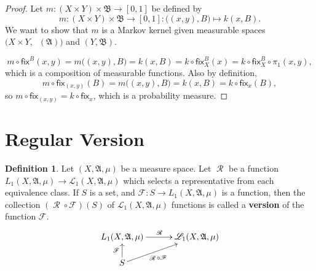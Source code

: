 \documentclass[
twoside=true,
paper=letter,
fontsize=9pt,
pagesize=auto,
leqno,
openany,
headsepline,
overfullrule,
]{scrbook}
\theoremstyle{plain}
\theoremstyle{plain}
\theoremstyle{definition}
\theoremstyle{bfnoteitalic}
\theoremstyle{bfnoteroman}
\newtheorem{defnboldnote}[thm]{Definition}
\newcommand{\term}[1]{\textbf{#1}\index{#1}}
\newcommand{\sigalg}[1]{\mathfrak{#1}}
\newcommand{\cali}[1]{\mathscr{#1}}
\newcommand{\sfop}[1]{\mathsf{#1}}
\newcommand{\preimage}[1]{\mathop{#1^{\leftarrow}}}
\newcommand{\sigmaalgebra}{\sigalg{A}}
\newcommand{\sigmaalgebraii}{\sigalg{B}}
\newcommand{\Lone}{L_1(\measurespace, \sigmaalgebra, \measure)}
\newcommand{\caliLone}{\cali{L}_1(\measurespace, \sigmaalgebra, \measure)}
\newcommand{\measurespace}{X}
\newcommand{\measurespaceii}{Y}
\newcommand{\mspaceelt}{x}
\newcommand{\mspaceeltii}{y}
\newcommand{\measure}{\mu}
\newcommand{\setii}{B}
\newcommand{\regular}{\mathop{\cali{R}}}
\newcommand{\projectionone}{\pi_1}
\newcommand{\markovkernel}{k}
\newcommand{\markovkernelii}{m}
\newcommand{\fixinthefirst}[1]{\sfop{fix}_{#1}}
\newcommand{\fixinthesecond}[1]{\sfop{fix}^{#1}}
\begin{document}
\begin{proof}
Let
$\markovkernelii:
(\measurespace\times\measurespaceii) \times \sigmaalgebraii 
\to
[0,1]$
be defined by
\[
\markovkernelii:
(\measurespace\times\measurespaceii) \times \sigmaalgebraii 
\to
[0,1]
: 
\bigl((\mspaceelt,\mspaceeltii),\setii\bigr)\mapsto 
\markovkernel(\mspaceelt,\setii).
\]
We want to show that 
$\markovkernelii$ is a Markov kernel given measurable spaces
$\bigl(\measurespace\times\measurespaceii, \preimage\projectionone(\sigmaalgebra)\bigr)$
and
$(\measurespaceii, \sigmaalgebraii)$.

\[
\markovkernelii\circ
\fixinthesecond{\setii}(\mspaceelt,\mspaceeltii)
=
\markovkernelii\bigl((\mspaceelt,\mspaceeltii),\setii\bigr)
=
\markovkernel(\mspaceelt,\setii)
=
\markovkernel\circ\fixinthesecond{\setii}_\measurespace(\mspaceelt)
=
\markovkernel\circ\fixinthesecond{\setii}_\measurespace\circ\projectionone(\mspaceelt,\mspaceeltii),
\]
which is a composition of measurable functions.
Also by definition,
\[
\markovkernelii\circ\fixinthefirst{(\mspaceelt,\mspaceeltii)}(\setii)
=
\markovkernelii\bigl((\mspaceelt,\mspaceeltii),\setii\bigr)
=
\markovkernel(\mspaceelt,\setii)
=
\markovkernel\circ\fixinthefirst{\mspaceelt}(\setii),
\]
so
$\markovkernelii\circ\fixinthefirst{(\mspaceelt,\mspaceeltii)}
=
\markovkernel\circ\fixinthefirst{\mspaceelt}$, which is a probability measure.
\end{proof}




\section{Regular Version}
\begin{defnboldnote}\label{version}
Let $(\measurespace,\sigmaalgebra,\measure)$ be a measure space.
Let 
$\regular$ be a function $\Lone\to\caliLone$ which selects a representative from each equivalence class.  
If $S$ is a set, and $\cali{F}: S \to \Lone$ is a function, then
the collection $(\regular\circ\cali{F})(S)$ of
$\caliLone$ functions is called a \term{version} of the function $\cali{F}$.
\[
\xymatrix@R=16pt@C=30pt{ 
\Lone \ar[r]^{\regular} & \caliLone \\
S \ar[ur]_-{\ \regular\circ\cali{F}} \ar[u]^{\cali{F}} & \\
}
\]
\end{defnboldnote}
\end{document}
